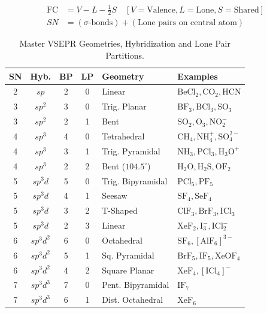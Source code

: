 \documentclass[10pt,twoside,openright]{book}
\begin{document}
\begin{formulabox}
\begin{align}
  \text{FC} &= V - L - \frac{1}{2}S \quad [V=\text{Valence}, L=\text{Lone}, S=\text{Shared}] \\
  SN &= (\sigma\text{-bonds}) + (\text{Lone pairs on central atom})
\end{align}
\end{formulabox}

\begin{table}[htbp]
\centering
\small
\renewcommand{\arraystretch}{1.2}
{\fontsize{7.0pt}{8.5pt}\selectfont\setlength{\tabcolsep}{1.5pt}
\begin{tabularx}{\linewidth}{c c c c l >{\RaggedRight}X}
\toprule
\textbf{SN} & \textbf{Hyb.} & \textbf{BP} & \textbf{LP} & \textbf{Geometry} & \textbf{Examples} \\
\midrule
2 & $sp$ & 2 & 0 & Linear & $\text{BeCl}_2, \text{CO}_2, \text{HCN}$ \\
3 & $sp^2$ & 3 & 0 & Trig. Planar & $\text{BF}_3, \text{BCl}_3, \text{SO}_3$ \\
3 & $sp^2$ & 2 & 1 & Bent & $\text{SO}_2, \text{O}_3, \text{NO}_2^-$ \\
4 & $sp^3$ & 4 & 0 & Tetrahedral & $\text{CH}_4, \text{NH}_4^+, \text{SO}_4^{2-}$ \\
4 & $sp^3$ & 3 & 1 & Trig. Pyramidal & $\text{NH}_3, \text{PCl}_3, \text{H}_3\text{O}^+$ \\
4 & $sp^3$ & 2 & 2 & Bent ($104.5^\circ$) & $\text{H}_2\text{O}, \text{H}_2\text{S}, \text{OF}_2$ \\
5 & $sp^3d$ & 5 & 0 & Trig. Bipyramidal & $\text{PCl}_5, \text{PF}_5$ \\
5 & $sp^3d$ & 4 & 1 & Seesaw & $\text{SF}_4, \text{SeF}_4$ \\
5 & $sp^3d$ & 3 & 2 & T-Shaped & $\text{ClF}_3, \text{BrF}_3, \text{ICl}_3$ \\
5 & $sp^3d$ & 2 & 3 & Linear & $\text{XeF}_2, \text{I}_3^-, \text{ICl}_2^-$ \\
6 & $sp^3d^2$ & 6 & 0 & Octahedral & $\text{SF}_6, [\text{AlF}_6]^{3-}$ \\
6 & $sp^3d^2$ & 5 & 1 & Sq. Pyramidal & $\text{BrF}_5, \text{IF}_5, \text{XeOF}_4$ \\
6 & $sp^3d^2$ & 4 & 2 & Square Planar & $\text{XeF}_4, [\text{ICl}_4]^-$ \\
7 & $sp^3d^3$ & 7 & 0 & Pent. Bipyramidal & $\text{IF}_7$ \\
7 & $sp^3d^3$ & 6 & 1 & Dist. Octahedral & $\text{XeF}_6$ \\
\bottomrule
\end{tabularx}}
\caption{Master VSEPR Geometries, Hybridization and Lone Pair Partitions.}
\end{table}
\end{document}

